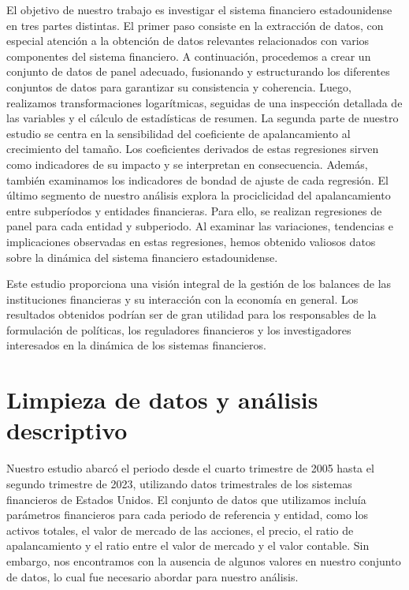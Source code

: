 \documentclass[a4paper,fleqn]{cas-sc}
\begin{document}
El objetivo de nuestro trabajo es investigar el sistema financiero estadounidense en tres partes distintas. El primer paso consiste en la extracción de datos, con especial atención a la obtención de datos relevantes relacionados con varios componentes del sistema financiero. A continuación, procedemos a crear un conjunto de datos de panel adecuado, fusionando y estructurando los diferentes conjuntos de datos para garantizar su consistencia y coherencia. Luego, realizamos transformaciones logarítmicas, seguidas de una inspección detallada de las variables y el cálculo de estadísticas de resumen. La segunda parte de nuestro estudio se centra en la sensibilidad del coeficiente de apalancamiento al crecimiento del tamaño. Los coeficientes derivados de estas regresiones sirven como indicadores de su impacto y se interpretan en consecuencia. Además, también examinamos los indicadores de bondad de ajuste de cada regresión. El último segmento de nuestro análisis explora la prociclicidad del apalancamiento entre subperíodos y entidades financieras. Para ello, se realizan regresiones de panel para cada entidad y subperiodo. Al examinar las variaciones, tendencias e implicaciones observadas en estas regresiones, hemos obtenido valiosos datos sobre la dinámica del sistema financiero estadounidense.

Este estudio proporciona una visión integral de la gestión de los balances de las instituciones financieras y su interacción con la economía en general. Los resultados obtenidos podrían ser de gran utilidad para los responsables de la formulación de políticas, los reguladores financieros y los investigadores interesados en la dinámica de los sistemas financieros.

\section{Limpieza de datos y análisis descriptivo}

Nuestro estudio abarcó el periodo desde el cuarto trimestre de 2005 hasta el segundo trimestre de 2023, utilizando datos trimestrales de los sistemas financieros de Estados Unidos. El conjunto de datos que utilizamos incluía parámetros financieros para cada periodo de referencia y entidad, como los activos totales, el valor de mercado de las acciones, el precio, el ratio de apalancamiento y el ratio entre el valor de mercado y el valor contable. Sin embargo, nos encontramos con la ausencia de algunos valores en nuestro conjunto de datos, lo cual fue necesario abordar para nuestro análisis.
\end{document}
